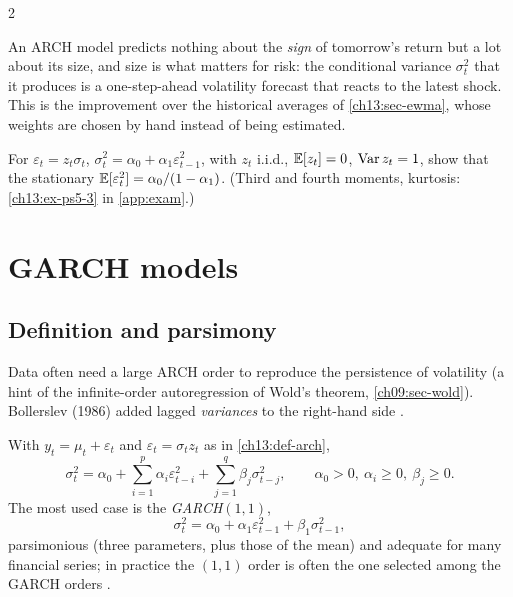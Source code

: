 \begin{paracol}{2}
\begin{finance}
An ARCH model predicts nothing about the \emph{sign} of tomorrow's return but a lot about its size, and size is what matters for risk: the conditional variance $\sigma_t^2$ that it produces is a one-step-ahead
volatility forecast that reacts to the latest shock. This is the improvement over the historical averages of \cref{ch13:sec-ewma}, whose weights are chosen by hand
instead of being estimated.
\end{finance}

\begin{exercise}\label{ch13:ex-ps5-3-short}
For $\varepsilon_t=z_t\sigma_t$, $\sigma_t^2=\alpha_0+\alpha_1\varepsilon_{t-1}^2$, with $z_t$ i.i.d., $\mathbb{E}[z_t]=0$, $\operatorname{Var} z_t=1$, show that the stationary $\mathbb{E}[\varepsilon_t^2]=\alpha_0/(1-\alpha_1)$. (Third and fourth moments, kurtosis: \cref{ch13:ex-ps5-3} in \cref{app:exam}.)
\end{exercise}


\section{GARCH models}\label{ch13:sec-garch}

\subsection{Definition and parsimony}\label{ch13:sec-garch-def}
Data often need a large ARCH order to reproduce the persistence of volatility (a hint of the infinite-order autoregression of Wold's theorem, \cref{ch09:sec-wold}). Bollerslev (1986)
added lagged \emph{variances} to the right-hand side .

\begin{definition}[GARCH$(p,q)$]\label{ch13:def-garch}
With $y_t=\mu_t+\varepsilon_t$ and $\varepsilon_t=\sigma_tz_t$ as in \cref{ch13:def-arch},
\begin{equation}\label{ch13:eq-garch}
  \sigma_t^2=\alpha_0+\sum_{i=1}^p\alpha_i\varepsilon_{t-i}^2+\sum_{j=1}^q\beta_j\sigma_{t-j}^2,\qquad\alpha_0>0,\ \alpha_i\ge0,\ \beta_j\ge0 .
\end{equation}
The most used case is the \emph{GARCH$(1,1)$},
\begin{equation}\label{ch13:eq-garch11}
  \sigma_t^2=\alpha_0+\alpha_1\varepsilon_{t-1}^2+\beta_1\sigma_{t-1}^2 ,
\end{equation}
parsimonious (three parameters, plus those of the mean) and adequate for many financial series; in practice the $(1,1)$ order is often the one selected among the GARCH orders
.
\end{definition}


\end{paracol}
